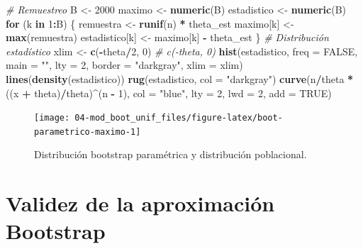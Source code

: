 \documentclass[]{book}
\newenvironment{Shaded}{\begin{snugshade}}{\end{snugshade}}
\newcommand{\KeywordTok}[1]{\textcolor[rgb]{0.13,0.29,0.53}{\textbf{#1}}}
\newcommand{\DataTypeTok}[1]{\textcolor[rgb]{0.13,0.29,0.53}{#1}}
\newcommand{\DecValTok}[1]{\textcolor[rgb]{0.00,0.00,0.81}{#1}}
\newcommand{\StringTok}[1]{\textcolor[rgb]{0.31,0.60,0.02}{#1}}
\newcommand{\CommentTok}[1]{\textcolor[rgb]{0.56,0.35,0.01}{\textit{#1}}}
\newcommand{\OtherTok}[1]{\textcolor[rgb]{0.56,0.35,0.01}{#1}}
\newcommand{\ControlFlowTok}[1]{\textcolor[rgb]{0.13,0.29,0.53}{\textbf{#1}}}
\newcommand{\OperatorTok}[1]{\textcolor[rgb]{0.81,0.36,0.00}{\textbf{#1}}}
\newcommand{\NormalTok}[1]{#1}
\theoremstyle{definition}
\theoremstyle{definition}
\theoremstyle{definition}
\theoremstyle{remark}
\begin{document}
\begin{Shaded}
\begin{Highlighting}[]
\CommentTok{# Remuestreo}
\NormalTok{B <-}\StringTok{ }\DecValTok{2000}
\NormalTok{maximo <-}\StringTok{ }\KeywordTok{numeric}\NormalTok{(B)}
\NormalTok{estadistico <-}\StringTok{ }\KeywordTok{numeric}\NormalTok{(B)}
\ControlFlowTok{for}\NormalTok{ (k }\ControlFlowTok{in} \DecValTok{1}\OperatorTok{:}\NormalTok{B) \{}
\NormalTok{    remuestra <-}\StringTok{ }\KeywordTok{runif}\NormalTok{(n) }\OperatorTok{*}\StringTok{ }\NormalTok{theta_est}
\NormalTok{    maximo[k] <-}\StringTok{ }\KeywordTok{max}\NormalTok{(remuestra)}
\NormalTok{    estadistico[k] <-}\StringTok{ }\NormalTok{maximo[k] }\OperatorTok{-}\StringTok{ }\NormalTok{theta_est}
\NormalTok{\}}
\CommentTok{# Distribución estadístico}
\NormalTok{xlim <-}\StringTok{ }\KeywordTok{c}\NormalTok{(}\OperatorTok{-}\NormalTok{theta}\OperatorTok{/}\DecValTok{2}\NormalTok{, }\DecValTok{0}\NormalTok{) }\CommentTok{# c(-theta, 0)}
\KeywordTok{hist}\NormalTok{(estadistico, }\DataTypeTok{freq =} \OtherTok{FALSE}\NormalTok{, }\DataTypeTok{main =} \StringTok{""}\NormalTok{, }\DataTypeTok{lty =} \DecValTok{2}\NormalTok{, }
     \DataTypeTok{border =} \StringTok{"darkgray"}\NormalTok{, }\DataTypeTok{xlim =}\NormalTok{ xlim)}
\KeywordTok{lines}\NormalTok{(}\KeywordTok{density}\NormalTok{(estadistico))}
\KeywordTok{rug}\NormalTok{(estadistico, }\DataTypeTok{col =} \StringTok{"darkgray"}\NormalTok{)}
\KeywordTok{curve}\NormalTok{(n}\OperatorTok{/}\NormalTok{theta }\OperatorTok{*}\StringTok{ }\NormalTok{((x }\OperatorTok{+}\StringTok{ }\NormalTok{theta)}\OperatorTok{/}\NormalTok{theta)}\OperatorTok{^}\NormalTok{(n }\OperatorTok{-}\StringTok{ }\DecValTok{1}\NormalTok{), }\DataTypeTok{col =} \StringTok{"blue"}\NormalTok{, }\DataTypeTok{lty =} \DecValTok{2}\NormalTok{, }\DataTypeTok{lwd =} \DecValTok{2}\NormalTok{, }\DataTypeTok{add =} \OtherTok{TRUE}\NormalTok{)}
\end{Highlighting}
\end{Shaded}

\begin{figure}[!htb]

{\centering \texttt{[image: 04-mod\_boot\_unif\_files/figure-latex/boot-parametrico-maximo-1]} 

}

\caption{Distribución bootstrap paramétrica y distribución poblacional.}\label{fig:boot-parametrico-maximo}
\end{figure}

\section{Validez de la aproximación
Bootstrap}\label{validez-de-la-aproximacion-bootstrap}
\end{document}
